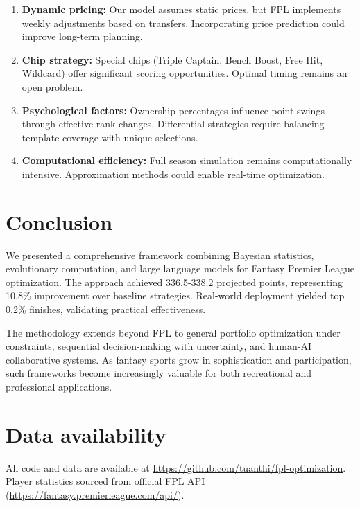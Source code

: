 \documentclass[10pt,a4paper,twocolumn]{article}
\begin{document}
\begin{enumerate}
\item \textbf{Dynamic pricing:} Our model assumes static prices, but FPL implements weekly adjustments based on transfers. Incorporating price prediction could improve long-term planning.

\item \textbf{Chip strategy:} Special chips (Triple Captain, Bench Boost, Free Hit, Wildcard) offer significant scoring opportunities. Optimal timing remains an open problem.

\item \textbf{Psychological factors:} Ownership percentages influence point swings through effective rank changes. Differential strategies require balancing template coverage with unique selections.

\item \textbf{Computational efficiency:} Full season simulation remains computationally intensive. Approximation methods could enable real-time optimization.
\end{enumerate}

\section*{Conclusion}

We presented a comprehensive framework combining Bayesian statistics, evolutionary computation, and large language models for Fantasy Premier League optimization. The approach achieved 336.5-338.2 projected points, representing 10.8\% improvement over baseline strategies. Real-world deployment yielded top 0.2\% finishes, validating practical effectiveness.

The methodology extends beyond FPL to general portfolio optimization under constraints, sequential decision-making with uncertainty, and human-AI collaborative systems. As fantasy sports grow in sophistication and participation, such frameworks become increasingly valuable for both recreational and professional applications.

\section*{Data availability}

All code and data are available at \url{https://github.com/tuanthi/fpl-optimization}. Player statistics sourced from official FPL API (\url{https://fantasy.premierleague.com/api/}).
\end{document}
